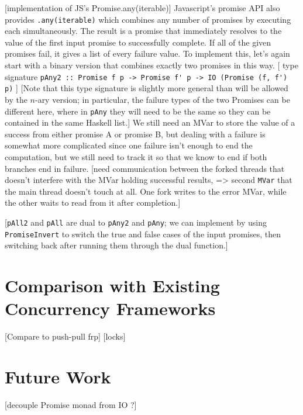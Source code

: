 \documentclass[sigplan,screen]{acmart}
\newcommand{\lit}[1]{\lstinline{#1}}
\begin{document}
[implementation of JS's Promise.any(iterable)] Javascript's promise API also provides \lit{.any(iterable)} which combines any number of promises by executing each simultaneously.  The result is a promise that immediately resolves to the value of the first input promise to successfully complete.  If all of the given promises fail, it gives a list of every failure value.  To implement this, let's again start with a binary version that combines exactly two promises in this way.  [ type signature \lit{pAny2 :: Promise f p -> Promise f' p -> IO (Promise (f, f') p)} ] [Note that this type signature is slightly more general than will be allowed by the \(n\)-ary version; in particular, the failure types of the two Promises can be different here, where in \lit{pAny} they will need to be the same so they can be contained in the same Haskell list.]  We still need an MVar to store the value of a success from either promise A or promise B, but dealing with a failure is somewhat more complicated since one failure isn't enough to end the computation, but we still need to track it so that we know to end if both branches end in failure. [need communication between the forked threads that doesn't interfere with the MVar holding successful results, => second \lit{MVar} that the main thread doesn't touch at all.  One fork writes to the error MVar, while the other waits to read from it after completion.]

[\lit{pAll2} and \lit{pAll} are dual to \lit{pAny2} and \lit{pAny}; we can implement by using \lit{PromiseInvert} to switch the true and false cases of the input promises, then switching back after running them through the dual function.]

\section{Comparison with Existing Concurrency Frameworks}
[Compare to push-pull frp]
[locks]

\section{Future Work}

[decouple Promise monad from IO ?]
\end{document}

